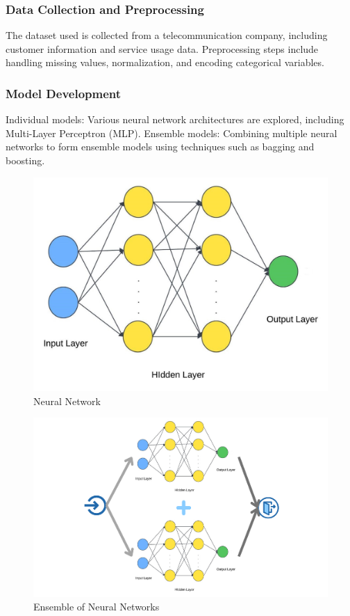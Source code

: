 \subsubsection{Data Collection and Preprocessing}

The dataset used is collected from a telecommunication company, including customer information and service usage data.
Preprocessing steps include handling missing values, normalization, and encoding categorical variables.
\subsubsection{Model Development}

Individual models: Various neural network architectures are explored, including Multi-Layer Perceptron (MLP).
Ensemble models: Combining multiple neural networks to form ensemble models using techniques such as bagging and boosting.
\begin{figure}[H]
    \centering
    \includegraphics[width=.8\textwidth]{img/NN.jpg}
    \caption{Neural Network}
    \label{fig:Neural Network}
\end{figure}
\begin{figure}[H]
    \centering
    \includegraphics[width=1\textwidth]{img/ensemble.png}
    \caption{Ensemble of Neural Networks}
    \label{fig:Ensemble}
\end{figure}

